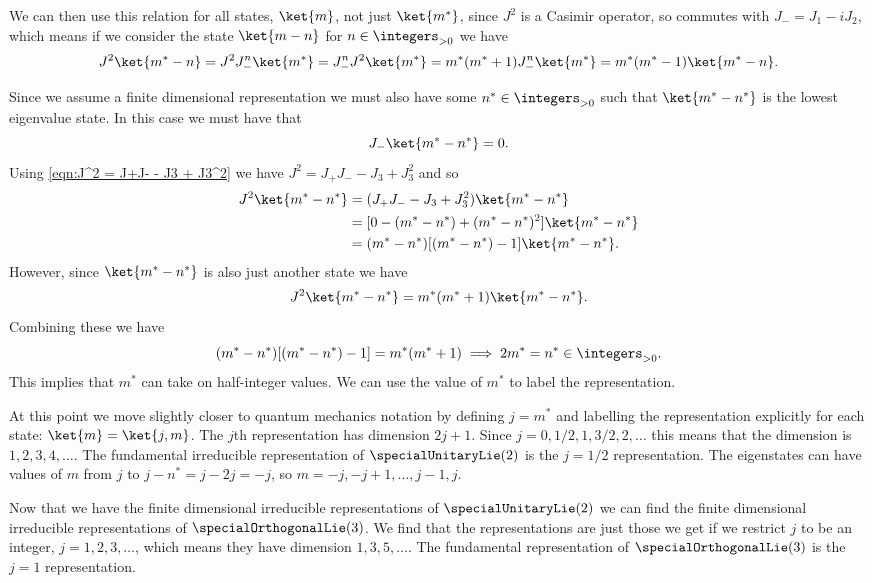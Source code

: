 We can then use this relation for all states, \(\ket{m}\), not just \(\ket{m^*}\), since \(J^2\) is a Casimir operator, so commutes with \(J_- = J_1 - iJ_2\), which means if we consider the state \(\ket{m - n}\) for \(n \in \positiveintegers\) we have
\begin{equation}
    J^2\ket{m^* - n} = J^2J_-^n\ket{m^*} = J_-^nJ^2\ket{m^*} = m^*(m^* + 1)J_-^n\ket{m^*} = m^*(m^* - 1)\ket{m^* - n}.
\end{equation}

Since we assume a finite dimensional representation we must also have some \(n^* \in \positiveintegers\) such that \(\ket{m^* - n^*}\) is the lowest eigenvalue state.
In this case we must have that
\begin{equation}
    J_-\ket{m^* - n^*} = 0.
\end{equation}
Using \cref{eqn:J^2 = J+J- - J3 + J3^2} we have \(J^2 = J_+J_- - J_3 + J_3^2\) and so
\begin{align}
    J^2\ket{m^* - n^*} &= (J_+J_- - J_3 + J_3^2)\ket{m^* - n^*}\\
    &= [0 - (m^* - n^*) + (m^* - n^*)^2]\ket{m^* - n^*}\\
    &= (m^* - n^*)[(m^* - n^*) - 1]\ket{m^* - n^*}.
\end{align}
However, since \(\ket{m^* - n^*}\) is also just another state we have
\begin{equation}
    J^2\ket{m^* - n^*} = m^*(m^* + 1)\ket{m^* - n^*}.
\end{equation}
Combining these we have
\begin{equation}
    (m^* - n^*)[(m^* - n^*) - 1] = m^*(m^* + 1) \implies 2m^* = n^* \in \positiveintegers.
\end{equation}
This implies that \(m^*\) can take on half-integer values.
We can use the value of \(m^*\) to label the representation.

At this point we move slightly closer to quantum mechanics notation by defining \(j = m^*\) and labelling the representation explicitly for each state: \(\ket{m} = \ket{j, m}\).
The \(j\)th representation has dimension \(2j + 1\).
Since \(j = 0, 1/2, 1, 3/2, 2, \dotsc\) this means that the dimension is \(1, 2, 3, 4, \dotsc\).
The fundamental irreducible representation of \(\specialUnitaryLie(2)\) is the \(j = 1/2\) representation.
The eigenstates can have values of \(m\) from \(j\) to \(j - n^* = j - 2j = -j\), so \(m = -j, -j + 1, \dotsc, j - 1, j\).

Now that we have the finite dimensional irreducible representations of \(\specialUnitaryLie(2)\) we can find the finite dimensional irreducible representations of \(\specialOrthogonalLie(3)\).
We find that the representations are just those we get if we restrict \(j\) to be an integer, \(j = 1, 2, 3, \dotsc\), which means they have dimension \(1, 3, 5, \dotsc\).
The fundamental representation of \(\specialOrthogonalLie(3)\) is the \(j = 1\) representation.

